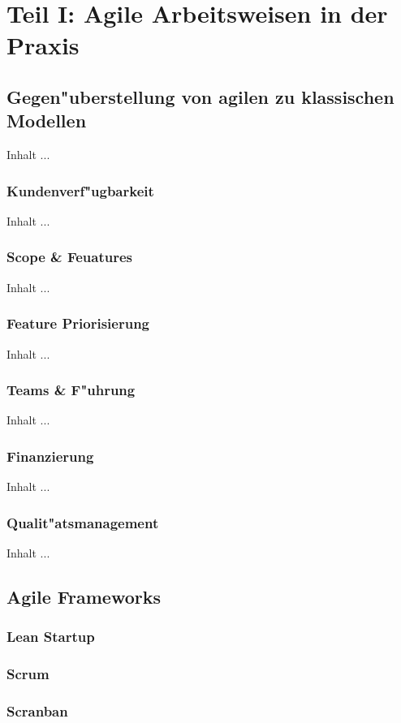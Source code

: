 
\chapter{Teil I: Agile Arbeitsweisen in der Praxis}
\minitoc 
\vspace{1 cm} 

\section{Gegen"uberstellung von agilen zu klassischen Modellen}
Inhalt ...

\subsection{Kundenverf"ugbarkeit}
Inhalt ...


\subsection{Scope \& Feuatures}
Inhalt ...

\subsection{Feature Priorisierung}
Inhalt ...

\subsection{Teams \& F"uhrung}
Inhalt ...

\subsection{Finanzierung}
Inhalt ...

\subsection{Qualit"atsmanagement}
Inhalt ...


\section{Agile Frameworks}

\subsection{Lean Startup}

\subsection{Scrum}

\subsection{Scranban}

